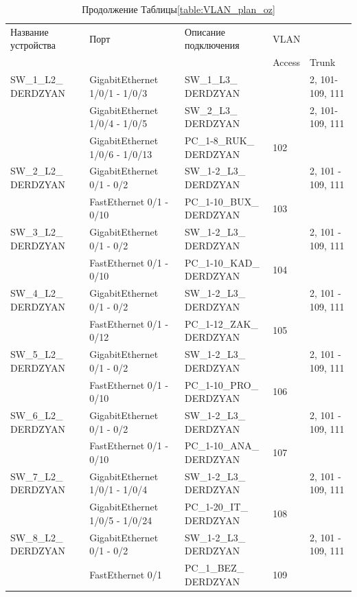 \begin{table}[H]
    \centering
	\caption{Продолжение Таблицы\;\ref{table:VLAN_plan_oz}}
    \small
	\begin{tabularx}{\textwidth}{|X|X|X|X|X|}
        \hline
		Название устройства	&	Порт	& Описание подключения 	& \multicolumn{2}{X|}{VLAN} \\
		\cline{4-5}
							&			&						&	Access	&	Trunk \\
		\hline
		SW\_1\_L2\_ DERDZYAN & GigabitEthernet 1/0/1 - 1/0/3 & SW\_1\_L3\_ DERDZYAN  && 2, 101-109, 111\\
		\cline{2-5}
			& GigabitEthernet 1/0/4 - 1/0/5 & SW\_2\_L3\_ DERDZYAN  &&  2, 101-109, 111\\
		\cline{2-5}
			& GigabitEthernet 1/0/6 - 1/0/13 & PC\_1-8\_RUK\_ DERDZYAN &102&\\
		\hline
		SW\_2\_L2\_ DERDZYAN & GigabitEthernet 0/1 - 0/2 & SW\_1-2\_L3\_ DERDZYAN  & &2, 101 - 109, 111\\
		\cline{2-5}
			& FastEthernet 0/1 - 0/10 & PC\_1-10\_BUX\_ DERDZYAN &	103	 &\\
		\hline
		SW\_3\_L2\_ DERDZYAN & GigabitEthernet 0/1 - 0/2 & SW\_1-2\_L3\_ DERDZYAN  &&2, 101 - 109, 111\\
		\cline{2-5}
			& FastEthernet 0/1 - 0/10 & PC\_1-10\_KAD\_ DERDZYAN &	104	&\\
		\hline
		SW\_4\_L2\_ DERDZYAN & GigabitEthernet 0/1 - 0/2 & SW\_1-2\_L3\_ DERDZYAN  &&2, 101 - 109, 111\\
		\cline{2-5}
			& FastEthernet 0/1 - 0/12 & PC\_1-12\_ZAK\_ DERDZYAN &	105	&\\
		\hline
		SW\_5\_L2\_ DERDZYAN & GigabitEthernet 0/1 - 0/2 & SW\_1-2\_L3\_ DERDZYAN  & 		&2, 101 - 109, 111\\
		\cline{2-5}
			& FastEthernet 0/1 - 0/10 & PC\_1-10\_PRO\_ DERDZYAN &	106	&\\
		\hline
		SW\_6\_L2\_ DERDZYAN & GigabitEthernet 0/1 - 0/2 & SW\_1-2\_L3\_ DERDZYAN  &		&2, 101 - 109, 111\\
		\cline{2-5}
			& FastEthernet 0/1 - 0/10 & PC\_1-10\_ANA\_ DERDZYAN &	107	&\\
		\hline
		SW\_7\_L2\_ DERDZYAN & GigabitEthernet 1/0/1 - 1/0/4 & SW\_1-2\_L3\_ DERDZYAN  &		&2, 101 - 109, 111\\
		\cline{2-5}
			& GigabitEthernet 1/0/5 - 1/0/24 & PC\_1-20\_IT\_ DERDZYAN &	108	 &\\
		\hline
		SW\_8\_L2\_ DERDZYAN & GigabitEthernet 0/1 - 0/2 & SW\_1-2\_L3\_ DERDZYAN  & 		&2, 101 - 109, 111\\
		\cline{2-5}
			& FastEthernet 0/1 & PC\_1\_BEZ\_ DERDZYAN &	109	&\\
    \end{tabularx}
\end{table}


